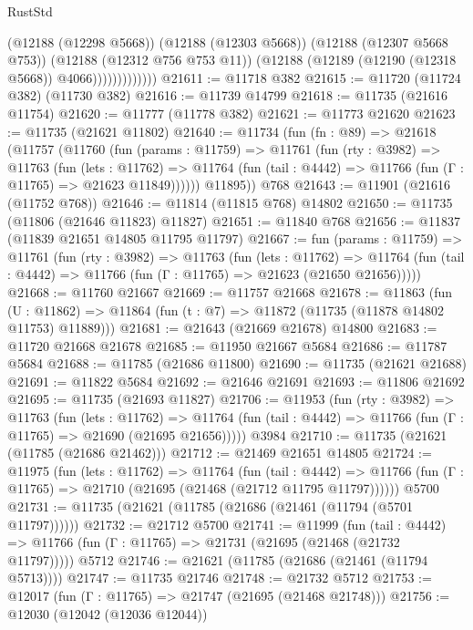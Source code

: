 \begin{lexlean}{RustStd}
\begin{coremodule}
                          (@12188 (@12298 @5668))
                          (@12188 (@12303 @5668))
                          (@12188 (@12307 @5668 @753))
                          (@12188 (@12312 @756 @753 @11))
                          (@12188 (@12189 (@12190 (@12318 @5668)) @4066)))))))))))))
@21611 := @11718 @382
@21615 := @11720 (@11724 @382) (@11730 @382)
@21616 := @11739 @14799
@21618 := @11735 (@21616 @11754)
@21620 := @11777 (@11778 @382)
@21621 := @11773 @21620
@21623 := @11735 (@21621 @11802)
@21640 := @11734
    (fun (fn : @89) =>
    @21618
      (@11757
        (@11760
          (fun (params : @11759) =>
          @11761
            (fun (rty : @3982) =>
            @11763
              (fun (lets : @11762) =>
              @11764 (fun (tail : @4442) => @11766 (fun (Γ : @11765) => @21623 @11849))))))
        @11895))
    @768
@21643 := @11901 (@21616 (@11752 @768))
@21646 := @11814 (@11815 @768) @14802
@21650 := @11735 (@11806 (@21646 @11823) @11827)
@21651 := @11840 @768
@21656 := @11837 (@11839 @21651 @14805 @11795 @11797)
@21667 := fun (params : @11759) =>
  @11761
    (fun (rty : @3982) =>
    @11763
      (fun (lets : @11762) =>
      @11764 (fun (tail : @4442) => @11766 (fun (Γ : @11765) => @21623 (@21650 @21656)))))
@21668 := @11760 @21667
@21669 := @11757 @21668
@21678 := @11863
    (fun (U : @11862) => @11864 (fun (t : @7) => @11872 (@11735 (@11878 @14802 @11753) @11889)))
@21681 := @21643 (@21669 @21678) @14800
@21683 := @11720 @21668 @21678
@21685 := @11950 @21667 @5684
@21686 := @11787 @5684
@21688 := @11785 (@21686 @11800)
@21690 := @11735 (@21621 @21688)
@21691 := @11822 @5684
@21692 := @21646 @21691
@21693 := @11806 @21692
@21695 := @11735 (@21693 @11827)
@21706 := @11953
    (fun (rty : @3982) =>
    @11763
      (fun (lets : @11762) =>
      @11764 (fun (tail : @4442) => @11766 (fun (Γ : @11765) => @21690 (@21695 @21656)))))
    @3984
@21710 := @11735 (@21621 (@11785 (@21686 @21462)))
@21712 := @21469 @21651 @14805
@21724 := @11975
    (fun (lets : @11762) =>
    @11764
      (fun (tail : @4442) =>
      @11766 (fun (Γ : @11765) => @21710 (@21695 (@21468 (@21712 @11795 @11797))))))
    @5700
@21731 := @11735 (@21621 (@11785 (@21686 (@21461 (@11794 (@5701 @11797))))))
@21732 := @21712 @5700
@21741 := @11999
    (fun (tail : @4442) => @11766 (fun (Γ : @11765) => @21731 (@21695 (@21468 (@21732 @11797)))))
    @5712
@21746 := @21621 (@11785 (@21686 (@21461 (@11794 @5713))))
@21747 := @11735 @21746
@21748 := @21732 @5712
@21753 := @12017 (fun (Γ : @11765) => @21747 (@21695 (@21468 @21748)))
@21756 := @12030 (@12042 (@12036 @12044))

\end{coremodule}
\end{lexlean}
